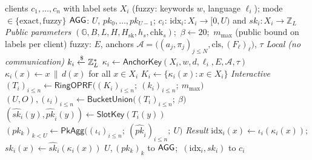 \begin{algorithm}[t]
\caption{$\mathsf{Setup}$: label union and KEM keys}
\label{alg:setup}
\begin{algorithmic}[1]
\Require clients $c_1,\dots,c_n$ with label sets $X_i$ (fuzzy: keywords $w$, language $\ell_i$);
  mode $\in\{\text{exact},\text{fuzzy}\}$
\Ensure $\mathsf{AGG}$: $U$, $pk_0,\dots,pk_{U-1}$; $c_i$: $\mathrm{idx}_i:X_i\to[0,U)$ and $sk_i:X_i\to\mathbb{Z}_L$
\Statex \textit{Public parameters}
\State $(\mathbb{G},B,L,H,H_{\mathrm{sk}},h_s,\mathrm{chk}_s)$;\ $\beta\gets 20$;\ $m_{\max}$ (public bound on labels per client)
\State fuzzy: $E$, anchors $\mathcal{A}=\bigl((a_j,\pi_j)_{j\le N},\mathrm{cls},(F_\ell)_\ell\bigr)$, $\tau$ 
\Statex \textit{Local (no communication)}
  \State $k_i\xleftarrow{\$}\mathbb{Z}_L^*$ 
    \State $\kappa_i\gets\mathsf{AnchorKey}(X_i,w,d,\ell_i,E,\mathcal{A},\tau)$
  \Else
    \State $\kappa_i(x)\gets x\,\|\,d(x)$ for all $x\in X_i$ 
  \EndIf
  \State $K_i\gets\{\kappa_i(x):x\in X_i\}$
\EndFor
\Statex \textit{Interactive}
\State $(T_i)_{i\le n}\gets\mathsf{RingOPRF}\bigl((K_i)_{i\le n};\ (k_i)_{i\le n};\ m_{\max}\bigr)$
\State $(U,O),(\iota_i)_{i\le n}\gets\mathsf{BucketUnion}\bigl((T_i)_{i\le n};\ \beta\bigr)$
  \State $(\hat{sk}_i(y),\hat{pk}_i(y))\gets\mathsf{SlotKey}(T_i(y))$
\EndFor
\State $(pk_k)_{k<U}\gets\mathsf{PkAgg}\bigl((\iota_i)_{i\le n};\ (\hat{pk}_i)_{i\le n};\ U\bigr)$
\Statex \textit{Result}
 
  \State $\mathrm{idx}_i(x)\gets\iota_i(\kappa_i(x))$;\quad $sk_i(x)\gets\hat{sk}_i(\kappa_i(x))$
\EndFor
\State \Return $U,(pk_k)_k$ to $\mathsf{AGG}$;\ $(\mathrm{idx}_i,sk_i)$ to $c_i$
\end{algorithmic}
\end{algorithm}
